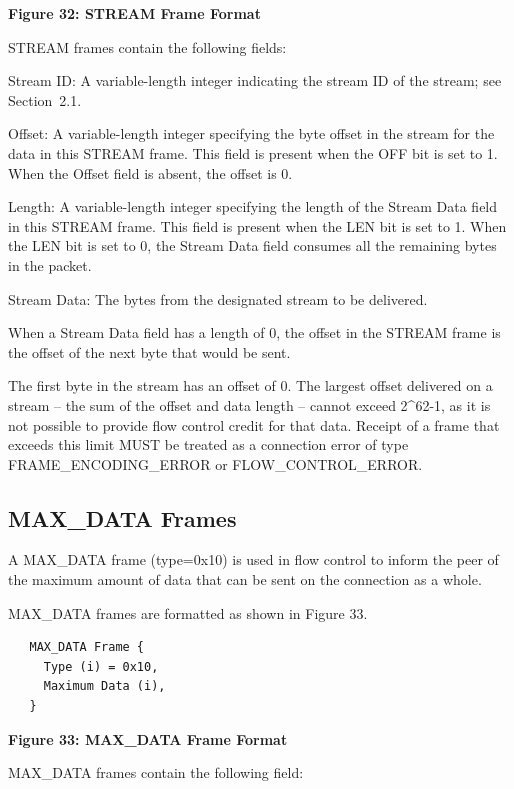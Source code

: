 \documentclass{article}
\begin{document}
\begin{center}
\textbf{Figure 32: STREAM Frame Format}
\end{center}

STREAM frames contain the following fields:

Stream ID:  A variable-length integer indicating the stream ID of the stream; see Section~2.1.

Offset:  A variable-length integer specifying the byte offset in the stream for the data in this STREAM frame.  This field is present when the OFF bit is set to 1.  When the Offset field is absent, the offset is 0.

Length:  A variable-length integer specifying the length of the Stream Data field in this STREAM frame.  This field is present when the LEN bit is set to 1.  When the LEN bit is set to 0, the Stream Data field consumes all the remaining bytes in the packet.

Stream Data:  The bytes from the designated stream to be delivered.

When a Stream Data field has a length of 0, the offset in the STREAM frame is the offset of the next byte that would be sent.

The first byte in the stream has an offset of 0.  The largest offset delivered on a stream -- the sum of the offset and data length -- cannot exceed 2\textasciicircum{}62-1, as it is not possible to provide flow control credit for that data.  Receipt of a frame that exceeds this limit MUST be treated as a connection error of type FRAME\_ENCODING\_ERROR or FLOW\_CONTROL\_ERROR.

\subsection{MAX\_DATA Frames}

A MAX\_DATA frame (type=0x10) is used in flow control to inform the peer of the maximum amount of data that can be sent on the connection as a whole.

MAX\_DATA frames are formatted as shown in Figure 33.

\begin{verbatim}
   MAX_DATA Frame {
     Type (i) = 0x10,
     Maximum Data (i),
   }
\end{verbatim}

\begin{center}
\textbf{Figure 33: MAX\_DATA Frame Format}
\end{center}

MAX\_DATA frames contain the following field:
\end{document}
